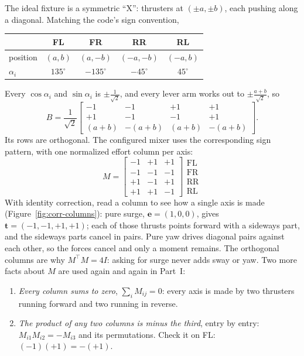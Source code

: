 The ideal fixture is a symmetric ``X'': thrusters at $(\pm a, \pm b)$, each pushing
along a diagonal. Matching the code's sign convention,
\begin{center}
\begin{tabular}{lcccc}
  \toprule
  & FL & FR & RR & RL\\
  \midrule
  position & $(a, b)$ & $(a, -b)$ & $(-a, -b)$ & $(-a, b)$\\
  $\alpha_i$ & $135^\circ$ & $-135^\circ$ & $-45^\circ$ & $45^\circ$\\
  \bottomrule
\end{tabular}
\end{center}
Every $\cos\alpha_i$ and $\sin\alpha_i$ is $\pm\frac{1}{\sqrt2}$, and every
lever arm works out to $\pm\frac{a+b}{\sqrt2}$, so
\[
  B = \frac{1}{\sqrt2}\begin{bmatrix}
    -1 & -1 & +1 & +1\\
    +1 & -1 & -1 & +1\\
    (a{+}b) & -(a{+}b) & (a{+}b) & -(a{+}b)
  \end{bmatrix}.
\]
Its rows are orthogonal. The configured mixer uses the corresponding sign
pattern, with one normalized effort column per axis:
\[
  M = \begin{bmatrix}
    -1 & +1 & +1\\
    -1 & -1 & -1\\
    +1 & -1 & +1\\
    +1 & +1 & -1
  \end{bmatrix}
  \begin{matrix}\text{FL}\\ \text{FR}\\ \text{RR}\\ \text{RL}\end{matrix}
\]
With identity correction, read a column to see how a single axis is made (Figure~\ref{fig:corr-columns}): pure
surge, $\bm e = (1,0,0)$, gives $\bm t = (-1,-1,+1,+1)$; each of those thrusts
points forward with a sideways part, and the sideways parts cancel in pairs.
Pure yaw drives diagonal pairs against each other, so the forces cancel and only
a moment remains. The orthogonal columns are why $M^\top M = 4I$: asking for
surge never adds sway or yaw. Two more facts about $M$ are used again and again
in Part~I:
\begin{enumerate}[nosep]
  \item \emph{Every column sums to zero}, $\sum_i M_{ij} = 0$: every axis is made
        by two thrusters running forward and two running in reverse.
  \item \emph{The product of any two columns is minus the third}, entry by entry:
        $M_{i1}M_{i2} = -M_{i3}$ and its permutations. Check it on FL:
        $(-1)(+1) = -(+1)$.
\end{enumerate}

